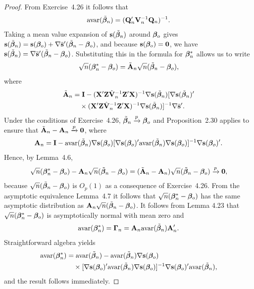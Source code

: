 \begin{proof}
From Exercise~4.26 it follows that
\[
\mathrm{avar}(\tilde{\boldsymbol{\beta}}_n) = (\mathbf{Q}_n'\mathbf{V}_n^{-1}\mathbf{Q}_n)^{-1}.
\]
Taking a mean value expansion of $\mathbf{s}(\tilde{\boldsymbol{\beta}}_n)$ around $\boldsymbol{\beta}_o$ gives $\mathbf{s}(\tilde{\boldsymbol{\beta}}_n) = \mathbf{s}(\boldsymbol{\beta}_o) +
\nabla \bar{\mathbf{s}}'(\tilde{\boldsymbol{\beta}}_n - \boldsymbol{\beta}_o)$, and because $\mathbf{s}(\boldsymbol{\beta}_o) = \mathbf{0}$, we have $\mathbf{s}(\tilde{\boldsymbol{\beta}}_n) = \nabla \bar{\mathbf{s}}'(\tilde{\boldsymbol{\beta}}_n - \boldsymbol{\beta}_o)$.
Substituting this in the formula for $\boldsymbol{\beta}_n^*$ allows us to write
\[
\sqrt{n}(\boldsymbol{\beta}_n^* - \boldsymbol{\beta}_o) = \tilde{\mathbf{A}}_n\sqrt{n}(\tilde{\boldsymbol{\beta}}_n - \boldsymbol{\beta}_o),
\]
where
\begin{align*}
\tilde{\mathbf{A}}_n &= \mathbf{I} - (\mathbf{X}'\mathbf{Z}\hat{\mathbf{V}}_n^{-1}\mathbf{Z}'\mathbf{X})^{-1}\nabla \mathbf{s}(\tilde{\boldsymbol{\beta}}_n)[\nabla \mathbf{s}(\tilde{\boldsymbol{\beta}}_n)' \\
&\quad\times(\mathbf{X}'\mathbf{Z}\hat{\mathbf{V}}_n^{-1}\mathbf{Z}'\mathbf{X})^{-1}\nabla \mathbf{s}(\tilde{\boldsymbol{\beta}}_n)]^{-1}\nabla \bar{\mathbf{s}}'.
\end{align*}
Under the conditions of Exercise~4.26, $\tilde{\boldsymbol{\beta}}_n \xrightarrow{p} \boldsymbol{\beta}_o$ and Proposition~2.30
applies to ensure that $\tilde{\mathbf{A}}_n - \mathbf{A}_n \xrightarrow{p} \mathbf{0}$, where
\[
\mathbf{A}_n = \mathbf{I} - \mathrm{avar}(\tilde{\boldsymbol{\beta}}_n)\nabla \mathbf{s}(\boldsymbol{\beta}_o)[\nabla \mathbf{s}(\boldsymbol{\beta}_o)'\mathrm{avar}(\tilde{\boldsymbol{\beta}}_n)\nabla \mathbf{s}(\boldsymbol{\beta}_o)]^{-1}\nabla \mathbf{s}(\boldsymbol{\beta}_o)'.
\]
Hence, by Lemma~4.6,
\[
\sqrt{n}(\boldsymbol{\beta}_n^* - \boldsymbol{\beta}_o) - \mathbf{A}_n\sqrt{n}(\tilde{\boldsymbol{\beta}}_n - \boldsymbol{\beta}_o) = (\tilde{\mathbf{A}}_n - \mathbf{A}_n)\sqrt{n}(\tilde{\boldsymbol{\beta}}_n - \boldsymbol{\beta}_o) \xrightarrow{p} \mathbf{0},
\]
because $\sqrt{n}(\tilde{\boldsymbol{\beta}}_n - \boldsymbol{\beta}_o)$ is $O_p(1)$ as a consequence of Exercise~4.26. From the
asymptotic equivalence Lemma~4.7 it follows that $\sqrt{n}(\boldsymbol{\beta}_n^* - \boldsymbol{\beta}_o)$ has the
same asymptotic distribution as $\mathbf{A}_n\sqrt{n}(\tilde{\boldsymbol{\beta}}_n - \boldsymbol{\beta}_o)$. It follows from Lemma
4.23 that $\sqrt{n}(\boldsymbol{\beta}_n^* - \boldsymbol{\beta}_o)$ is asymptotically normal with mean zero and
\[
\mathrm{avar}(\boldsymbol{\beta}_n^*) = \boldsymbol{\Gamma}_n = \mathbf{A}_n\mathrm{avar}(\tilde{\boldsymbol{\beta}}_n)\mathbf{A}_n'.
\]
Straightforward algebra yields
\begin{align*}
\mathrm{avar}(\boldsymbol{\beta}_n^*) &= \mathrm{avar}(\tilde{\boldsymbol{\beta}}_n) - \mathrm{avar}(\tilde{\boldsymbol{\beta}}_n)\nabla \mathbf{s}(\boldsymbol{\beta}_o) \\
&\quad\times[\nabla \mathbf{s}(\boldsymbol{\beta}_o)'\mathrm{avar}(\tilde{\boldsymbol{\beta}}_n)\nabla \mathbf{s}(\boldsymbol{\beta}_o)]^{-1}\nabla \mathbf{s}(\boldsymbol{\beta}_o)'\mathrm{avar}(\tilde{\boldsymbol{\beta}}_n),
\end{align*}
and the result follows immediately.
\end{proof}

